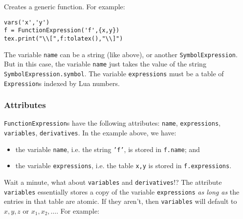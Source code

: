 \documentclass{article}
\begin{document}
Creates a generic function. For example:
\begin{codebox}
    \begin{verbatim}
vars('x','y')
f = FunctionExpression('f',{x,y})
tex.print("\\[",f:tolatex(),"\\]")
    \end{verbatim}
    \tcblower
\end{codebox}
The variable \texttt{name} can be a string (like above), or another \texttt{SymbolExpression}. But in this case, the variable \texttt{name} just takes the value of the string \texttt{SymbolExpression.symbol}. The variable \texttt{expressions} must be a table of \texttt{Expression}s indexed by Lua numbers.

\subsubsection*{Attributes}
\texttt{FunctionExpression}s have the following attributes: \texttt{name}, \texttt{expressions}, \texttt{variables}, \texttt{derivatives}. In the example above, we have:
\begin{itemize}
    \item the variable \texttt{name}, i.e. the string \texttt{'f'}, is stored in \texttt{f.name}; and
    \item the variable \texttt{expressions}, i.e. the table \texttt{{x,y}} is stored in \texttt{f.expressions}.
\end{itemize}
Wait a minute, what about \texttt{variables} and \texttt{derivatives}!? The attribute \texttt{variables} essentially stores a copy of the variable \texttt{expressions} \textit{as long as} the entries in that table are atomic. If they aren't, then \texttt{variables} will default to $x,y,z$ or $x_1,x_2,\ldots$. For example:
\end{document}
